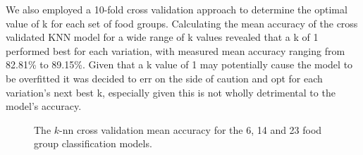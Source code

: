 \documentclass[11pt]{article}
\begin{document}
We also employed a 10-fold cross validation approach to determine the optimal value of k for each set of food groups. Calculating the mean accuracy of the cross validated KNN model for a wide range of k values revealed that a k of 1 performed best for each variation, with measured mean accuracy ranging from 82.81\% to 89.15\%. Given that a k value of 1 may potentially cause the model to be overfitted it was decided to err on the side of caution and opt for each variation's next best k, especially given this is not wholly detrimental to the model's accuracy. 

\begin{figure}[htbp]
    \centering
    \qquad
    \qquad
    \caption{The $k$-nn cross validation mean accuracy for the 6, 14 and 23 food group classification models.}
    \label{fig:knn-cross-validation}
\end{figure}
\end{document}
